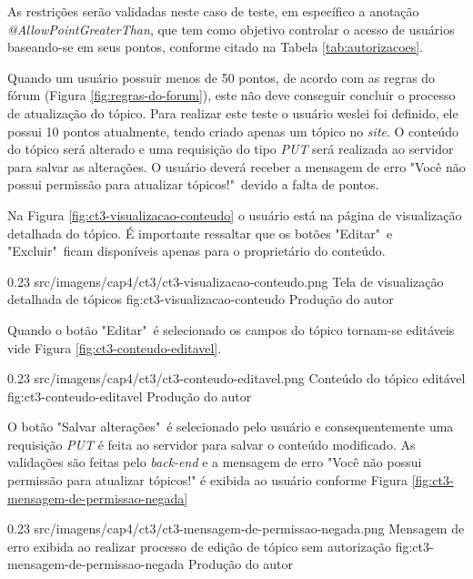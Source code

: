 \par As restrições serão validadas neste caso de teste, em específico a anotação \textit{@AllowPointGreaterThan}, que tem como objetivo controlar o acesso de usuários baseando-se em seus pontos, conforme citado na Tabela \ref{tab:autorizacoes}.
\par Quando um usuário possuir menos de 50 pontos, de acordo com as regras do fórum (Figura \ref{fig:regras-do-forum}), este não deve conseguir concluir o processo de atualização do tópico. Para realizar este teste o usuário weslei foi definido, ele possui 10 pontos atualmente, tendo criado apenas um tópico no \textit{site}. O conteúdo do tópico será alterado e uma requisição do tipo \textit{PUT} será realizada ao servidor para salvar as alterações. O usuário deverá receber a mensagem de erro "Você não possui permissão para atualizar tópicos!"\ devido a falta de pontos.

\par Na Figura \ref{fig:ct3-visualizacao-conteudo} o usuário está na página de visualização detalhada do tópico. É importante ressaltar que os botões "Editar"\ e "Excluir"\ ficam disponíveis apenas para o proprietário do conteúdo. 

\begin{image}
{0.23}
{src/imagens/cap4/ct3/ct3-visualizacao-conteudo.png}
{Tela de visualização detalhada de tópicos}
{fig:ct3-visualizacao-conteudo}
{Produção do autor}
\end{image}

\par Quando o botão "Editar"\ é selecionado os campos do tópico tornam-se editáveis vide Figura \ref{fig:ct3-conteudo-editavel}.

\begin{image}
{0.23}
{src/imagens/cap4/ct3/ct3-conteudo-editavel.png}
{Conteúdo do tópico editável}
{fig:ct3-conteudo-editavel}
{Produção do autor}
\end{image}

\par O botão "Salvar alterações"\ é selecionado pelo usuário e consequentemente uma requisição \textit{PUT} é feita ao servidor para salvar o conteúdo modificado. As validações são feitas pelo \textit{back-end} e a mensagem de erro "Você não possui permissão para atualizar tópicos!" é exibida ao usuário conforme Figura \ref{fig:ct3-mensagem-de-permissao-negada}

\begin{image}
{0.23}
{src/imagens/cap4/ct3/ct3-mensagem-de-permissao-negada.png}
{Mensagem de erro exibida ao realizar processo de edição de tópico sem autorização}
{fig:ct3-mensagem-de-permissao-negada}
{Produção do autor}
\end{image}

